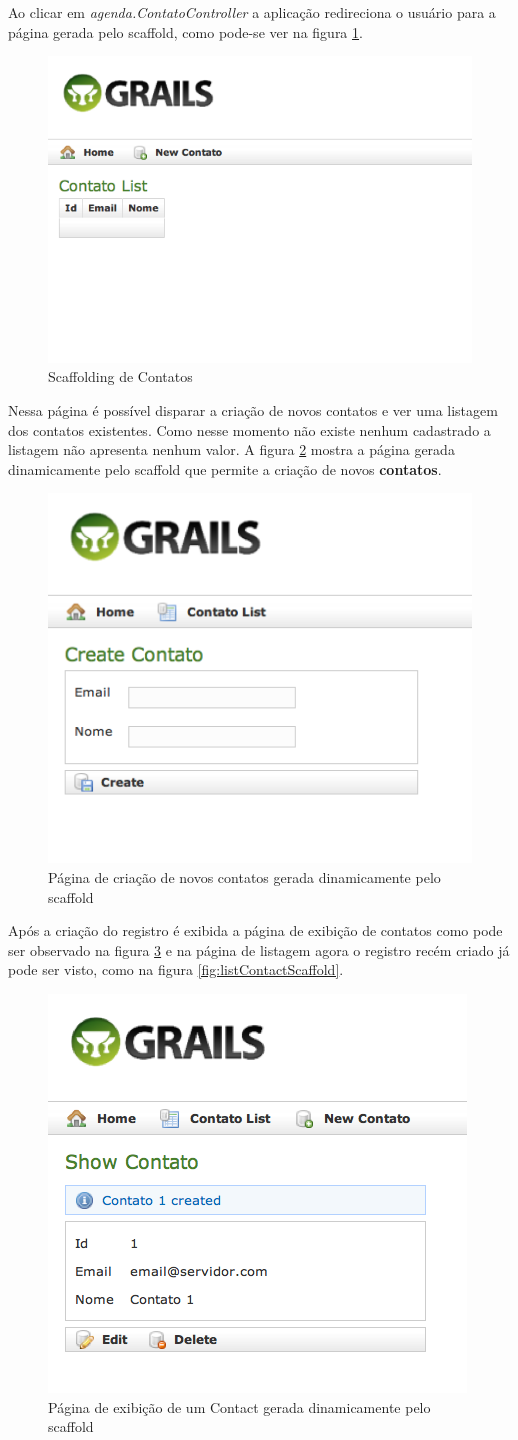 \documentclass[12pt]{article}
\begin{document}
   Ao clicar em \emph{agenda.ContatoController} a aplicação redireciona o usuário para
   a página gerada pelo scaffold, como pode-se ver na figura \ref{fig:contactScaffold2}.
   
   \begin{figure}[h!]
      \centering
      \includegraphics[width=.4\textwidth]{images/contactControllerScaffold2.png}
      \caption{Scaffolding de Contatos}
      \label{fig:contactScaffold2}
  \end{figure}
  
  Nessa página é possível disparar a criação de novos contatos e ver uma listagem
  dos contatos existentes. Como nesse momento não existe nenhum cadastrado a listagem
  não apresenta nenhum valor. A figura \ref{fig:createContactScaffold} mostra a 
  página gerada dinamicamente pelo scaffold que permite a criação de novos \textbf{contatos}.
  
   \begin{figure}[h!]
      \centering
      \includegraphics[width=.4\textwidth]{images/createContactScaffold.png}
      \caption{Página de criação de novos contatos gerada dinamicamente pelo scaffold}
      \label{fig:createContactScaffold}
  \end{figure}
  
  Após a criação do registro é exibida a página de exibição de contatos como pode 
  ser observado na figura \ref{fig:showContactScaffold} e na página de listagem
  agora o registro recém criado já pode ser visto, como na figura \ref{fig:listContactScaffold}.

   \begin{figure}[h!]
      \centering
      \includegraphics[width=.3\textwidth]{images/showContactScaffold.png}
      \caption{Página de exibição de um Contact gerada dinamicamente pelo scaffold}
      \label{fig:showContactScaffold}
  \end{figure}
  
\end{document}

